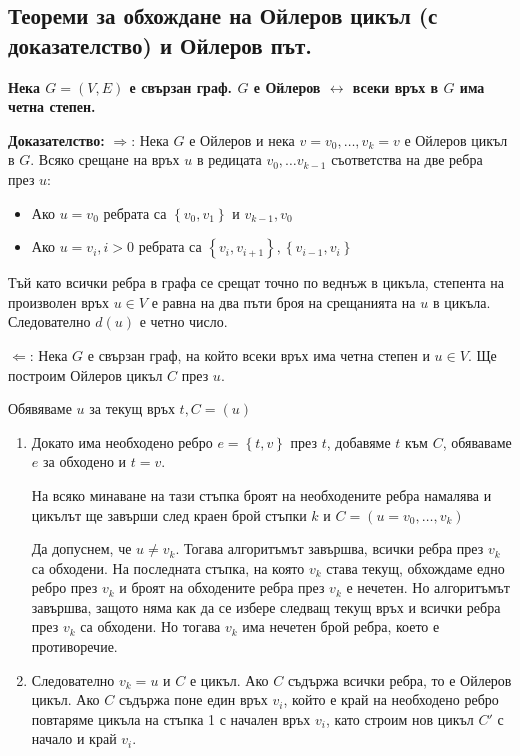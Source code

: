 \documentclass{article}
\renewcommand{\\}{\newline}
\newcommand{\doc}{\textbf{Доказателство: }}
\begin{document}
      \subsection{Теореми за обхождане на Ойлеров цикъл (с доказателство) и Ойлеров път.} 
      \textbf{Нека \(G=(V,E)\) е свързан граф. \(G\) е Ойлеров \(\leftrightarrow\) всеки връх в \(G\) има четна степен.}

      \doc \(\Rightarrow\): Нека \(G\) е Ойлеров и нека \(v = v_{0}, \dots, v_{k} = v\) е Ойлеров цикъл в \(G\). Всяко срещане на връх \(u\) в редицата \(v_{0}, \dots v_{k-1}\) съответства на две ребра през \(u\):
      \begin{itemize}
          \item Ако \(u = v_0\) ребрата са \(\left\{v_0, v_1\right\}\) и \(v_{k-1}, v_0\)
          \item Ако \(u = v_{i}, i > 0\) ребрата са \(\left\{v_i, v_{i+1}\right\}, \left\{v_{i-1}, v_{i}\right\}\)  
      \end{itemize}

      Тъй като всички ребра в графа се срещат точно по веднъж в цикъла, степента на произволен връх \(u \in V\) е равна на два пъти броя на срещанията на \(u\) в цикъла. Следователно \(d(u)\) е четно число. 

      \(\Leftarrow\): Нека \(G\) е свързан граф, на който всеки връх има четна степен и \(u \in V\). Ще построим Ойлеров цикъл \(C\)  през \(u\).   

      Обявяваме \(u\) за текущ връх \(t, C = (u)\)  

      \begin{enumerate}
          \item Докато има необходено ребро \(e = \left\{t, v\right\}\) през \(t\), добавяме \(t\) към \(C\), обяваваме \(e\) за обходено и \( t = v\). 

            На всяко минаване на тази стъпка броят на необходените ребра намалява и цикълът ще завърши след краен брой стъпки \(k\) и \(C = (u = v_0, \dots, v_{k})\) 

            Да допуснем, че \(u \not= v_{k}\). Тогава алгоритъмът завършва, всички ребра през \(v_{k}\) са обходени. На последната стъпка, на която \(v_k\) става текущ, обхождаме едно ребро през \(v_k\) и броят на обходените ребра през \(v_k\) е нечетен. Но алгоритъмът завършва, защото няма как да се избере следващ текущ връх и всички ребра през \(v_k\) са обходени. Но тогава \(v_k\) има нечетен брой ребра, което е  противоречие.

          \item Следователно \(v_k = u\) и \(C\) е цикъл. Ако \(C\) съдържа всички ребра, то е Ойлеров цикъл. Ако \(C\) съдържа поне един връх \(v_i\), който е край на необходено ребро повтаряме цикъла на стъпка 1 с начален връх \(v_i\), като строим нов цикъл \(C'\) с начало и край \(v_i\). 

      \end{enumerate}
\end{document}
